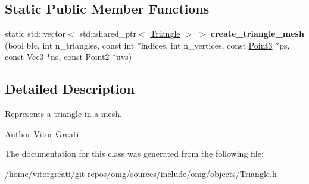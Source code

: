 \subsection*{Static Public Member Functions}
\begin{DoxyCompactItemize}
\item 
\mbox{\label{classomg_1_1_triangle_afe024c094d76cc1047af285babdf5873}} 
static std\+::vector$<$ std\+::shared\+\_\+ptr$<$ \mbox{\hyperlink{classomg_1_1_triangle}{Triangle}} $>$ $>$ {\bfseries create\+\_\+triangle\+\_\+mesh} (bool bfc, int n\+\_\+triangles, const int $\ast$indices, int n\+\_\+vertices, const \mbox{\hyperlink{namespaceomg_af85242d35fdacf829d32a6f9b95f3e35}{Point3}} $\ast$ps, const \mbox{\hyperlink{namespaceomg_a45a9482677fee9933ff369b49894e316}{Vec3}} $\ast$ns, const \mbox{\hyperlink{namespaceomg_a18e42fb7bbc4159e9137145b866ec578}{Point2}} $\ast$uvs)
\end{DoxyCompactItemize}


\subsection{Detailed Description}
Represents a triangle in a mesh. 

\begin{DoxyAuthor}{Author}
Vitor Greati 
\end{DoxyAuthor}


The documentation for this class was generated from the following file\+:\begin{DoxyCompactItemize}
\item 
/home/vitorgreati/git-\/repos/omg/sources/include/omg/objects/Triangle.\+h\end{DoxyCompactItemize}
